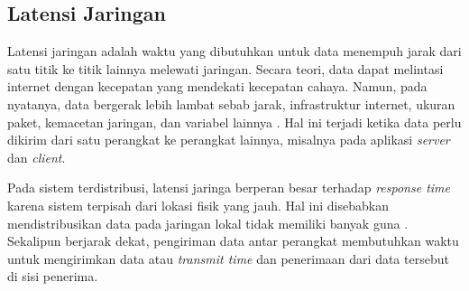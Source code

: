 \subsection{Latensi Jaringan}

Latensi jaringan adalah waktu yang dibutuhkan untuk data menempuh jarak dari satu titik ke titik lainnya melewati jaringan. Secara teori, data dapat melintasi internet dengan kecepatan yang mendekati kecepatan cahaya. Namun, pada nyatanya, data bergerak lebih lambat sebab jarak, infrastruktur internet, ukuran paket, kemacetan jaringan, dan variabel lainnya \parencite{goodwin2023latency}. Hal ini terjadi ketika data perlu dikirim dari satu perangkat ke perangkat lainnya, misalnya pada aplikasi \textit{server} dan \textit{client}.

Pada sistem terdistribusi, latensi jaringa berperan besar terhadap \textit{response time} karena sistem terpisah dari lokasi fisik yang jauh. Hal ini disebabkan mendistribusikan data pada jaringan lokal tidak memiliki banyak guna \parencite{johansson2000impact}. Sekalipun berjarak dekat, pengiriman data antar perangkat membutuhkan waktu untuk mengirimkan data atau \textit{transmit time} dan penerimaan dari data tersebut di sisi penerima.

